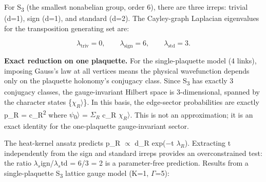 \documentclass[11pt,a4paper]{article}
\theoremstyle{remark}
\begin{document}
For S\textsubscript{3} (the smallest nonabelian group, order 6), there are three irreps:
trivial (d=1), sign (d=1), and standard (d=2). The Cayley-graph Laplacian
eigenvalues for the transposition generating set are:

\[
\lambda_{\mathrm{triv}} = 0, \qquad \lambda_{\mathrm{sign}} = 6, \qquad
\lambda_{\mathrm{std}} = 3.
\]

\textbf{Exact reduction on one plaquette.} For the single-plaquette model (4 links),
imposing Gauss's law at all vertices means the physical wavefunction depends
only on the plaquette holonomy's conjugacy class. Since S\textsubscript{3} has exactly 3
conjugacy classes, the gauge-invariant Hilbert space is 3-dimensional, spanned
by the character states \{\textbar{}\(\chi_R\)\ensuremath{\rangle}\}. In this basis, the edge-sector
probabilities are exactly p\_R = \textbar c\_R\textbar{}\textsuperscript{2} where \textbar{}\ensuremath{\psi}\textsubscript{0}\ensuremath{\rangle} = \(\Sigma_R\) c\_R
\textbar{}\(\chi_R\)\ensuremath{\rangle}. This is not an approximation; it is an exact identity for the
one-plaquette gauge-invariant sector.

The heat-kernel ansatz predicts p\_R \ensuremath{\propto} d\_R exp(\ensuremath{-}t \(\lambda_R\)). Extracting
t independently from the sign and standard irreps provides an overconstrained
test: the ratio \(\lambda{}_s\)ign/\(\lambda{}_s\)td = 6/3 = 2 is a
parameter-free prediction. Results from a single-plaquette S\textsubscript{3} lattice gauge
model (K=1, \ensuremath{\Gamma}=5):
\end{document}
